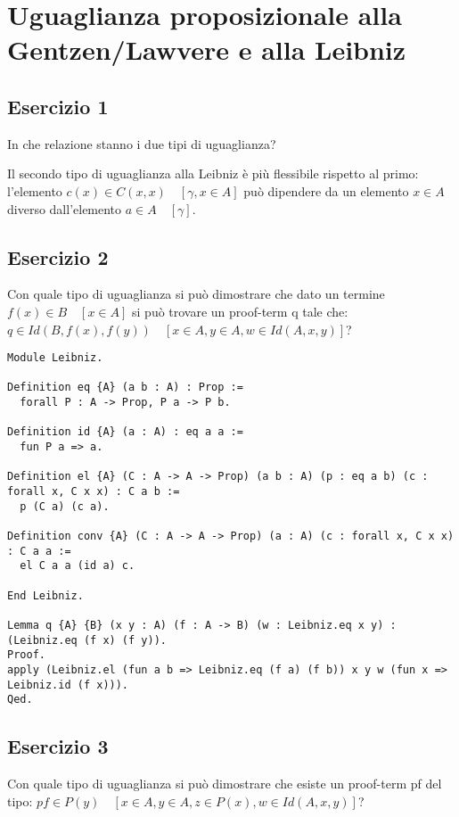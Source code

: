 \newpage
\section{Uguaglianza proposizionale alla Gentzen/Lawvere e alla Leibniz}

\subsection{Esercizio 1}

In che relazione stanno i due tipi di uguaglianza?

Il secondo tipo di uguaglianza alla Leibniz è più flessibile rispetto al primo:
l'elemento $c(x) \in C(x,x) \quad [\gamma, x \in A]$ può dipendere da un elemento
$x \in A$ diverso dall'elemento $a \in A \quad [\gamma]$.

\subsection{Esercizio 2}

Con quale tipo di uguaglianza si può dimostrare che dato un termine
$f(x) \in B \quad [x \in A]$ si può trovare un proof-term q tale che:
$q \in Id(B, f(x), f(y)) \quad [x \in A, y \in A, w \in Id(A,x,y)]$?

\begin{lstlisting}[language=Coq]
Module Leibniz.

Definition eq {A} (a b : A) : Prop :=
  forall P : A -> Prop, P a -> P b.

Definition id {A} (a : A) : eq a a :=
  fun P a => a.

Definition el {A} (C : A -> A -> Prop) (a b : A) (p : eq a b) (c : forall x, C x x) : C a b :=
  p (C a) (c a).

Definition conv {A} (C : A -> A -> Prop) (a : A) (c : forall x, C x x) : C a a :=
  el C a a (id a) c.

End Leibniz.

Lemma q {A} {B} (x y : A) (f : A -> B) (w : Leibniz.eq x y) : (Leibniz.eq (f x) (f y)).
Proof.
apply (Leibniz.el (fun a b => Leibniz.eq (f a) (f b)) x y w (fun x => Leibniz.id (f x))).
Qed.
\end{lstlisting}

\subsection{Esercizio 3}

Con quale tipo di uguaglianza si può dimostrare che esiste un proof-term pf del
tipo: $pf \in P(y) \quad [x \in A, y \in A, z \in P(x), w \in Id(A,x,y)]$?


